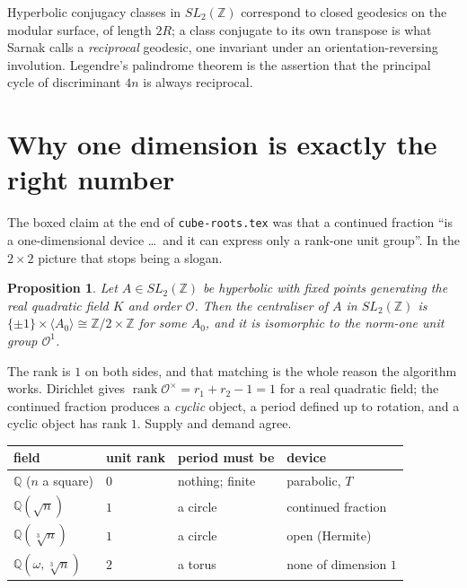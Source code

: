 \documentclass[12pt,a4paper]{article}
\theoremstyle{plain}
\newtheorem{proposition}[theorem]{Proposition}
\theoremstyle{definition}
\begin{document}
Hyperbolic conjugacy classes in $SL_2(\mathbb{Z})$ correspond to closed geodesics on the modular surface, of length $2R$; a class conjugate to its own transpose is what Sarnak calls a \emph{reciprocal} geodesic, one invariant under an orientation-reversing involution. Legendre's palindrome theorem is the assertion that the principal cycle of discriminant $4n$ is always reciprocal.

\section{Why one dimension is exactly the right number}

The boxed claim at the end of \texttt{cube-roots.tex} was that a continued fraction ``is a one-dimensional device \ldots\ and it can express only a rank-one unit group''. In the $2\times2$ picture that stops being a slogan.

\begin{proposition}
Let $A \in SL_2(\mathbb{Z})$ be hyperbolic with fixed points generating the real quadratic field $K$ and order $\mathcal{O}$. Then the centraliser of $A$ in $SL_2(\mathbb{Z})$ is $\{\pm1\}\times\langle A_0\rangle \cong \mathbb{Z}/2 \times \mathbb{Z}$ for some $A_0$, and it is isomorphic to the norm-one unit group $\mathcal{O}^{1}$.
\end{proposition}

The rank is $1$ on both sides, and that matching is the whole reason the algorithm works. Dirichlet gives $\operatorname{rank}\mathcal{O}^\times = r_1+r_2-1 = 1$ for a real quadratic field; the continued fraction produces a \emph{cyclic} object, a period defined up to rotation, and a cyclic object has rank $1$. Supply and demand agree.

\begin{center}
\begin{tabular}{llll}
\toprule
field & unit rank & period must be & device \\
\midrule
$\mathbb{Q}$ ($n$ a square)       & $0$ & nothing; finite & parabolic, $T$ \\
$\mathbb{Q}(\sqrt n)$             & $1$ & a circle & continued fraction \\
$\mathbb{Q}(\sqrt[3]{n})$         & $1$ & a circle & open (Hermite) \\
$\mathbb{Q}(\omega,\sqrt[3]{n})$  & $2$ & a torus  & none of dimension $1$ \\
\bottomrule
\end{tabular}
\end{center}
\end{document}
